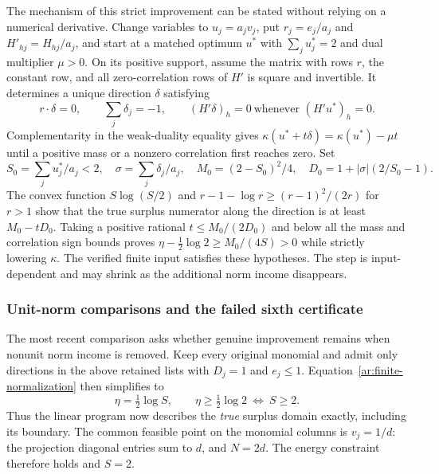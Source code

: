 The mechanism of this strict improvement can be stated without relying on a numerical derivative.
Change variables to $u_j=a_jv_j$, put $r_j=e_j/a_j$ and $H'_{hj}=H_{hj}/a_j$, and start at a matched optimum $u^*$ with $\sum_j u_j^*=2$ and dual multiplier $\mu>0$.
On its positive support, assume the matrix with rows $r$, the constant row, and all zero-correlation rows of $H'$ is square and invertible.
It determines a unique direction $\delta$ satisfying
\[
 r\cdot\delta=0,\qquad \sum_j\delta_j=-1,\qquad
 (H'\delta)_h=0\ \text{whenever }(H'u^*)_h=0.
\]
Complementarity in the weak-duality equality gives $\kappa(u^*+t\delta)=\kappa(u^*)-\mu t$ until a positive mass or a nonzero correlation first reaches zero.
Set
\[
 S_0=\sum_j u_j^*/a_j<2,\quad
 \sigma=\sum_j\delta_j/a_j,\quad
 M_0=(2-S_0)^2/4,\quad D_0=1+|\sigma|(2/S_0-1).
\]
The convex function $S\log(S/2)$ and $r-1-\log r\ge(r-1)^2/(2r)$ for $r>1$ show that the true surplus numerator along the direction is at least $M_0-tD_0$.
Taking a positive rational $t\le M_0/(2D_0)$ and below all the mass and correlation sign bounds proves $\eta-\frac12\log2\ge M_0/(4S)>0$ while strictly lowering $\kappa$.
The verified finite input satisfies these hypotheses.
The step is input-dependent and may shrink as the additional norm income disappears.

\subsubsection{Unit-norm comparisons and the failed sixth certificate}
\label{ar:unit-comparisons}

The most recent comparison asks whether genuine improvement remains when nonunit norm income is removed.
Keep every original monomial and admit only directions in the above retained lists with $D_j=1$ and $e_j\le1$.
Equation~\eqref{ar:finite-normalization} then simplifies to
\begin{equation}
 \eta=\tfrac12\log S,
 \qquad \eta\ge\tfrac12\log2\ \Longleftrightarrow\ S\ge2.
 \label{ar:unit-exact-domain}
\end{equation}
Thus the linear program now describes the \emph{true} surplus domain exactly, including its boundary.
The common feasible point on the monomial columns is $v_j=1/d$: the projection diagonal entries sum to $d$, and $N=2d$.
The energy constraint therefore holds and $S=2$.

